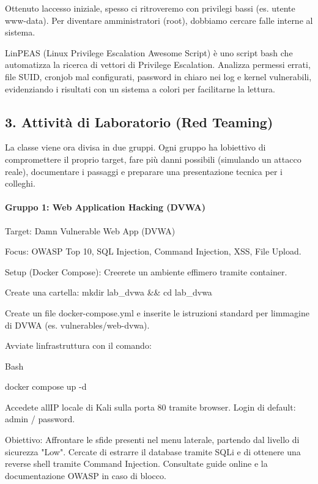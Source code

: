 \documentclass[11pt,a4paper]{article}
\begin{document}
Ottenuto l\textquotesingle accesso iniziale, spesso ci ritroveremo con
privilegi bassi (es. utente www-data). Per diventare amministratori
(root), dobbiamo cercare falle interne al sistema.

LinPEAS (Linux Privilege Escalation Awesome Script) è uno script bash
che automatizza la ricerca di vettori di Privilege Escalation. Analizza
permessi errati, file SUID, cronjob mal configurati, password in chiaro
nei log e kernel vulnerabili, evidenziando i risultati con un sistema a
colori per facilitarne la lettura.

\subsection{3. Attività di Laboratorio (Red
Teaming)}\label{attivituxe0-di-laboratorio-red-teaming}

La classe viene ora divisa in due gruppi. Ogni gruppo ha
l\textquotesingle obiettivo di compromettere il proprio target, fare più
danni possibili (simulando un attacco reale), documentare i passaggi e
preparare una presentazione tecnica per i colleghi.

\paragraph{Gruppo 1: Web Application Hacking
(DVWA)}\label{gruppo-1-web-application-hacking-dvwa}

Target: Damn Vulnerable Web App (DVWA)

Focus: OWASP Top 10, SQL Injection, Command Injection, XSS, File Upload.

Setup (Docker Compose): Creerete un ambiente effimero tramite container.

Create una cartella: mkdir lab\_dvwa \&\& cd lab\_dvwa

Create un file docker-compose.yml e inserite le istruzioni standard per
l\textquotesingle immagine di DVWA (es. vulnerables/web-dvwa).

Avviate l\textquotesingle infrastruttura con il comando:

Bash

docker compose up -d

Accedete all\textquotesingle IP locale di Kali sulla porta 80 tramite
browser. Login di default: admin / password.

Obiettivo: Affrontare le sfide presenti nel menu laterale, partendo dal
livello di sicurezza "Low". Cercate di estrarre il database tramite SQLi
e di ottenere una reverse shell tramite Command Injection. Consultate
guide online e la documentazione OWASP in caso di blocco.
\end{document}
